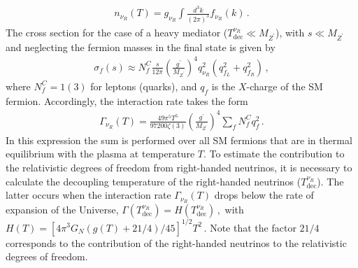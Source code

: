 \documentclass[12pt]{article}
\begin{document}
\begin{align*}
n_{\nu_R}(T) = g_{\nu_R} \int \frac{d^{3} k}{(2 \pi)^{3}} f_{\nu_R}(k)\,.
\end{align*}
The cross section for the case of a heavy mediator ($T^{\nu_R}_{\text{dec}} \ll M_{Z^{\prime}}$), with $s \ll M_{Z^{\prime}}$ and neglecting the fermion masses in the final state is given by~\cite{Barger:2003zh}
%
\begin{align}
    \sigma_{f}(s) \approx N^{C}_{f} \frac{s}{12 \pi} \left( \frac{g^{\prime}}{M_{Z^{\prime}}} \right)^{4} q^{2}_{\nu_R} (q^{2}_{f_L} + q^{2}_{f_R})\,,
\end{align}
%
where $N^{C}_{f}=1(3)$ for leptons (quarks),
and $q_{f}$ is the $X$-charge of the SM fermion.  
Accordingly, the interaction rate takes the form
%
\begin{align}
    \Gamma_{\nu_{R}}(T) = \frac{49 \pi^{5} T^{5}}{97200 \zeta(3)} \left( \frac{g^{\prime}}{M_{Z^{\prime}}} \right)^{4} \sum_{f} N^{C}_{f} q^{2}_{f}\,.
\end{align}
%
In this expression the sum is performed over all SM fermions that are in thermal equilibrium with the plasma at temperature $T$. To estimate the contribution to the relativistic degrees of freedom from right-handed neutrinos, it is necessary to calculate the decoupling temperature of the right-handed neutrinos ($T^{\nu_R}_{\text{dec}}$). The latter occurs when the interaction rate $\Gamma_{\nu_{R}}(T)$ drops below the rate of expansion of the Universe, $\Gamma(T^{\nu_R}_{\text{dec}}) = H(T^{\nu_R}_{\text{dec}})\,, $
%
%
%
with $H(T)= [4 \pi^{3} G_{N}(g(T) + 21/4)/45]^{1/2} T^{2}\,.$
%
%
Note that the factor $21/4$ corresponds to the contribution of the right-handed neutrinos to the relativistic degrees of freedom. 
\end{document}
